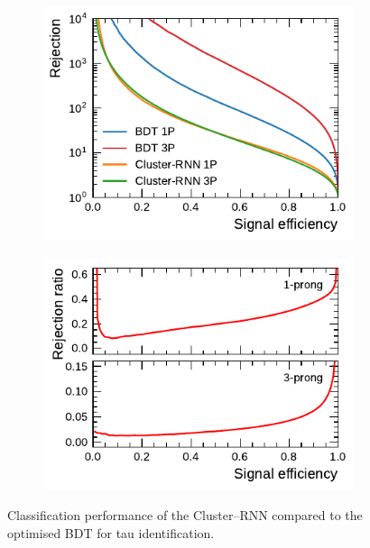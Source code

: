 
\begin{figure}[ht]
  \begin{subfigure}[t]{0.48\textwidth}
    \centering
    \includegraphics{./figures/rnn/cluster/roc.pdf}
  \end{subfigure}\hfill
  \begin{subfigure}[t]{0.48\textwidth}
    \centering
    \includegraphics{./figures/rnn/cluster/ratios.pdf}
  \end{subfigure}
  \caption{Classification performance of the Cluster--RNN compared to the optimised
    BDT for tau identification.}
  \label{fig:cluster_rnn_roc_ratios}
\end{figure}

